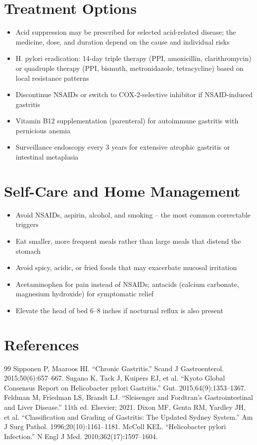 \section*{Treatment Options}
\begin{itemize}
  \item Acid suppression may be prescribed for selected acid-related disease; the medicine, dose, and duration depend on the cause and individual risks
  \item H. pylori eradication: 14-day triple therapy (PPI, amoxicillin, clarithromycin) or quadruple therapy (PPI, bismuth, metronidazole, tetracycline) based on local resistance patterns
  \item Discontinue NSAIDs or switch to COX-2-selective inhibitor if NSAID-induced gastritis
  \item Vitamin B12 supplementation (parenteral) for autoimmune gastritis with pernicious anemia
  \item Surveillance endoscopy every 3 years for extensive atrophic gastritis or intestinal metaplasia
\end{itemize}

\section*{Self-Care and Home Management}
\begin{itemize}
  \item Avoid NSAIDs, aspirin, alcohol, and smoking -- the most common correctable triggers
  \item Eat smaller, more frequent meals rather than large meals that distend the stomach
  \item Avoid spicy, acidic, or fried foods that may exacerbate mucosal irritation
  \item Acetaminophen for pain instead of NSAIDs; antacids (calcium carbonate, magnesium hydroxide) for symptomatic relief
  \item Elevate the head of bed 6--8 inches if nocturnal reflux is also present
\end{itemize}

\section*{References}
\begin{thebibliography}{99}
 Sipponen P, Maaroos HI. ``Chronic Gastritis.'' Scand J Gastroenterol. 2015;50(6):657--667.
 Sugano K, Tack J, Kuipers EJ, et al. ``Kyoto Global Consensus Report on Helicobacter pylori Gastritis.'' Gut. 2015;64(9):1353--1367.
 Feldman M, Friedman LS, Brandt LJ. ``Sleisenger and Fordtran's Gastrointestinal and Liver Disease.'' 11th ed. Elsevier; 2021.
 Dixon MF, Genta RM, Yardley JH, et al. ``Classification and Grading of Gastritis: The Updated Sydney System.'' Am J Surg Pathol. 1996;20(10):1161--1181.
 McColl KEL. ``Helicobacter pylori Infection.'' N Engl J Med. 2010;362(17):1597--1604.
\end{thebibliography}

